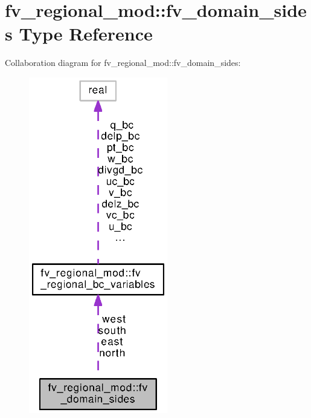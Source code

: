 \section{fv\-\_\-regional\-\_\-mod\-:\-:fv\-\_\-domain\-\_\-sides Type Reference}
\label{structfv__regional__mod_1_1fv__domain__sides}


Collaboration diagram for fv\-\_\-regional\-\_\-mod\-:\-:fv\-\_\-domain\-\_\-sides\-:
\nopagebreak
\begin{figure}[H]
\begin{center}
\leavevmode
\includegraphics[width=172pt]{structfv__regional__mod_1_1fv__domain__sides__coll__graph}
\end{center}
\end{figure}

